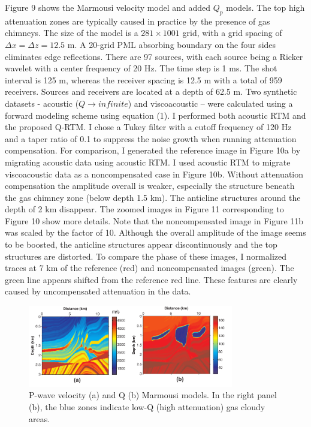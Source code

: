 Figure 9 shows the Marmousi velocity model and added $Q_p$ models. The top high attenuation zones are typically caused in practice by the presence of gas chimneys. The size of the model is a $281\times 1001$ grid, with a grid spacing of  $\Delta x=\Delta z=12.5$ m. A 20-grid PML absorbing boundary on the four sides eliminates edge reflections. There are 97 sources, with each source being a Ricker wavelet with a center frequency of 20 Hz. The time step is 1 ms. The shot interval is 125 m, whereas the receiver spacing is 12.5 m with a total of 959 receivers. Sources and receivers are located at a depth of 62.5 m. Two synthetic datasets - acoustic ($Q\rightarrow infinite$) and viscoacoustic – were calculated using a forward modeling scheme using equation (1). I performed both acoustic RTM and the proposed Q-RTM. I chose a Tukey filter with a cutoff frequency of 120 Hz and a taper ratio of 0.1 to suppress the noise growth when running attenuation compensation. 
For comparison, I generated the reference image in Figure 10a by migrating acoustic data using acoustic RTM. I used acoustic RTM to migrate viscoacoustic data as a noncompensated case in Figure 10b. Without attenuation compensation the amplitude overall is weaker, especially the structure beneath the gas chimney zone (below depth 1.5 km). The anticline structures around the depth of 2 km disappear. The zoomed images in Figure 11 corresponding to Figure 10 show more details. Note that the noncompensated image in Figure 11b was scaled by the factor of 10. Although the overall amplitude of the image seems to be boosted, the anticline structures appear discontinuously and the top structures are distorted. To compare the phase of these images, I normalized traces at 7 km of the reference (red) and noncompensated images (green). The green line appears shifted from the reference red line. These features are clearly caused by uncompensated attenuation in the data. 

 \begin{figure}[!htb]
   \centering
   \includegraphics[width=0.8\textwidth]{Fig/fig9-eps-converted-to}
   \caption{P-wave velocity (a) and Q (b) Marmousi models. In the right panel (b), the blue zones indicate low-Q (high attenuation) gas cloudy areas.}
 \end{figure}

